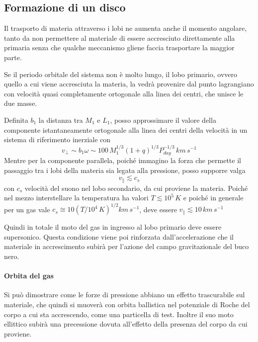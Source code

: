 \documentclass[a4paperbi]{article}
\begin{document}
\subsection{Formazione di un disco}
	Il trasporto di materia attraverso i lobi ne aumenta anche il momento angolare, tanto da non permettere al materiale di essere accresciuto direttamente alla primaria senza che qualche meccanismo gliene faccia trasportare la maggior parte.
	
	Se il periodo orbitale del sistema non è molto lungo, il lobo primario, ovvero quello a cui viene accresciuta la materia, la vedrà provenire dal punto lagrangiano con velocità quasi completamente ortogonale alla linea dei centri, che unisce le due masse. 
	
	Definita $b_1$ la distanza tra $M_1$ e $L_1$, posso approssimare il valore della componente istantaneamente ortogonale alla linea dei centri della velocità in un sistema di riferimento inerziale con
	\begin{equation}
		v_\perp\sim b_1\omega\sim 100\,M_1^{1/3}(1+q)^{1/3}P^{-1/3}_{day}\,km\,s^{-1}
	\end{equation}  
	Mentre per la componente parallela, poiché immagino la forza che permette il passaggio tra i lobi della materia sia legata alla pressione, posso supporre valga
	\begin{equation}
		v_\parallel \lesssim c_{s}
	\end{equation}
	con $c_{s}$ velocità del suono nel lobo secondario, da cui proviene la materia. Poiché nel mezzo interstellare la temperatura ha valori $T\lesssim10^5\,K$ e poiché in generale per un gas vale $c_s\cong10(T/10^4\,K)^{1/2}km\,s^{-1}$, deve essere $v_\parallel\lesssim10\,km\,s^{-1}$
	
	Quindi in totale il moto del gas in ingresso al lobo primario deve essere supersonico. Questa condizione viene poi rinforzata dall'accelerazione che il materiale in accrescimento subirà per l'azione del campo gravitazionale del buco nero.

	\paragraph{Orbita del gas}	
	Si può dimostrare come le forze di pressione abbiano un effetto trascurabile sul materiale, che quindi si muoverà con orbita ballistica nel potenziale di Roche del corpo a cui sta accrescendo, come una particella di test. Inoltre il suo moto ellittico subirà una precessione dovuta all'effetto della presenza del corpo da cui proviene.
	
\end{document}

